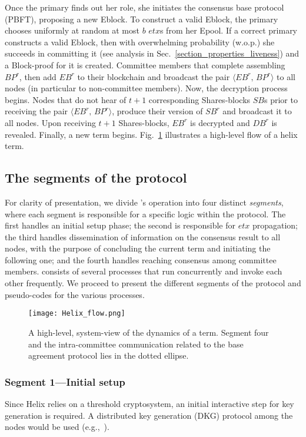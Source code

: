 Once the primary finds out her role, she initiates the consensus base protocol (PBFT), proposing a new Eblock. To construct a valid Eblock, the primary chooses uniformly at random at most $b$ $etx$s from her Epool. If a correct primary constructs a valid Eblock, then with overwhelming probability (w.o.p.) she succeeds in committing it (see analysis in Sec.~\ref{section_properties_liveness}) and a Block-proof for it is created. Committee members that complete assembling $BP^r$, then add $EB^r$ to their blockchain and broadcast the pair $\langle EB^r\text{, } BP^r \rangle$ to all nodes (in particular to non-committee members). Now, the decryption process begins. Nodes that do not hear of $t+1$ corresponding Shares-blocks $SB$s prior to receiving the pair $\langle EB^r\text{, } BP^r \rangle$, produce their version of $SB^r$ and broadcast it to all nodes. Upon receiving $t+1$ Shares-blocks, $EB^r$ is decrypted and $DB^r$ is revealed. Finally, a new term begins. Fig.~\ref{term_flow} illustrates a high-level flow of a helix term.


\subsection{The segments of the \name protocol}
\label{Helix_segments}

For clarity of presentation, we divide \nameNS's operation into four distinct \emph{segments}, where each segment is responsible for a specific logic within the protocol. The first handles an initial setup phase; the second is responsible for $etx$ propagation; the third handles dissemination of information on the consensus result to all nodes, with the purpose of concluding the current term and initiating the following one; and the fourth handles reaching consensus among committee members. 
\name consists of several processes that run concurrently and invoke each other frequently. We proceed to present the different segments of the protocol and pseudo-codes for the various processes.

\begin{figure}
\texttt{[image: Helix\_flow.png]}
\caption{A high-level, system-view of the dynamics of a \name term. Segment four and the intra-committee communication related to the base agreement protocol lies in the dotted ellipse.}
\label{term_flow}
\end{figure}

\subsubsection*{Segment 1---Initial setup}
Since Helix relies on a threshold cryptosystem, an initial interactive step for key generation is required. A distributed key generation (DKG) protocol among the nodes would be used (e.g.,~\cite{Shoup-Gennaro, Boldyreva, NoLeaderThersholdDK2001}).

